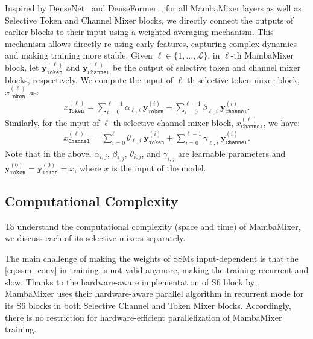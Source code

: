\documentclass{article}
\newcommand{\head}[1]{\vspace{1.7mm}\noindent{{\textcolor{c1}{\bf #1.}}}}
\begin{document}
\head{Weighted Averaging of Earlier Features} Inspired by DenseNet~\citep{huang2017densely} and DenseFormer~\citep{pagliardini2024denseformer}, for all MambaMixer layers as well as Selective Token and Channel Mixer blocks, we directly connect the outputs of earlier blocks to their input using a weighted averaging mechanism. This mechanism allows directly re-using early features, capturing complex dynamics and making training more stable. Given $\ell \in \{ 1, \dots, \mathcal{L}\}$, in $\ell$-th MambaMixer block, let $\mathbf{y}^{(\ell)}_{\texttt{Token}}$ and $\mathbf{y}^{(\ell)}_{\texttt{Channel}}$ be the output of selective token and channel mixer blocks, respectively. We compute the input of $\ell$-th selective token mixer block, $x_{\texttt{Token}}^{(\ell)}$ as:
\begin{align}
    {x}_{\texttt{Token}}^{(\ell)} =  \sum_{i = 0}^{\ell - 1} \alpha_{\ell, i} \: \mathbf{y}^{(i)}_{\texttt{Token}} + \sum_{i = 0}^{\ell - 1} \beta_{\ell, i} \: \mathbf{y}^{(i)}_{\texttt{Channel}}.
\end{align}
Similarly, for the input of $\ell$-th selective channel mixer block, $x_{\texttt{Channel}}^{(\ell)}$, we have: 
\begin{align}
    {x}_{\texttt{Channel}}^{(\ell)} =  \sum_{i = 0}^{\ell} \theta_{\ell, i} \: \mathbf{y}^{(i)}_{\texttt{Token}} + \sum_{i = 0}^{\ell - 1} \gamma_{\ell, i} \: \mathbf{y}^{(i)}_{\texttt{Channel}}.
\end{align}
Note that in the above, $\alpha_{i, j}$, $\beta_{i, j}$, $\theta_{i, j}$, and $\gamma_{i, j}$ are learnable parameters and $\mathbf{y}^{(0)}_{\texttt{Token}} = \mathbf{y}^{(0)}_{\texttt{Token}} = x$, where $x$ is the input of the model.



\subsection{Computational Complexity}
To understand the computational complexity (space and time) of MambaMixer, we discuss each of its selective mixers separately. 

\head{Hardware-aware Implementation}
The main challenge of making the weights of SSMs input-dependent is that the \autoref{eq:ssm_conv} in training is not valid anymore, making the training recurrent and slow. Thanks to the hardware-aware implementation of S6 block by \citet{gu2023mamba}, MambaMixer uses their hardware-aware parallel algorithm in recurrent mode for its S6 blocks in both Selective Channel and Token Mixer blocks. Accordingly, there is no restriction for hardware-efficient parallelization of MambaMixer training.
\end{document}
